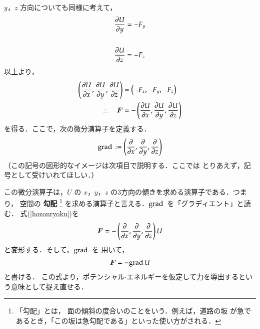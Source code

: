                     $y$，$z$ 方向についても同様に考えて，
                        \begin{align}
                        \frac{\partial U}{\partial y}&=-F_{y} \\
                        \notag \\
                        \frac{\partial U}{\partial z}&=-F_{z}
                        \end{align}
                    以上より，
                        \begin{align}\label{hozonryoku}
                            \left( \frac{\rd U}{\rd x} , \frac{\rd U}{\rd y},
                            \frac{\rd U}{\rd z}\right)
                            &=\left( -F_{x} , -F_{y} ,-F_{z} \right) \notag \\
                            \therefore \quad \bF
                            &=-\left( \frac{\rd U}{\rd x} ,
                            \frac{\rd U}{\rd y},
                            \frac{\rd U}{\rd z}\right)
                        \end{align}
                    を得る．ここで，次の微分演算子を定義する．
                        \begin{align}
                        \mathrm{grad}\,:= \left( \frac{\partial}{\partial x} , \frac{\partial}{\partial y},
                        \frac{\partial}{\partial z}\right)
                        \end{align}
                    （この記号の図形的なイメージは次項目で説明する．ここでは
                    とりあえず，記号として受けいれてほしい．）

                    この微分演算子は，$U$ の $x$，$y$，$z$ の3方向の傾きを求める演算子である．つまり，
                    空間の \textbf{勾配}
                        \footnote{
                            「勾配」とは，
                            面の傾斜の度合いのことをいう．例えば，道路の坂
                            が急であるとき，「この坂は急勾配である」といった使い方がされる．
                        }
                    を求める演算子と言える．$\mathrm{grad}\,$ を「グラディエント」と読む．
                    式(\ref{hozonryoku})を
                        \begin{align}
                            \boldsymbol{F}=-\left( \frac{\partial}{\partial x} ,
                            \frac{\partial}{\partial y},
                            \frac{\partial}{\partial z}\right)U
                        \end{align} と変形する．そして，$\mathrm{grad}\,$ を
                    用いて，\\
                            \begin{align}
                                \boldsymbol{F}=-\mathrm{grad\,} U
                            \end{align}
                    と書ける．
                    この式より，ポテンシャル$\cdot$エネルギーを仮定して力を導出するという意味として捉え直せる．

